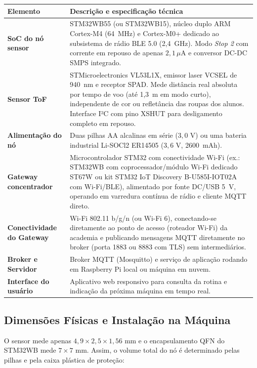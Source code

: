 \documentclass[11pt,a4paper]{article}
\begin{document}
\begin{longtable}{|L{4.8cm}|L{10.0cm}|}
\hline
\textbf{Elemento} & \textbf{Descrição e especificação técnica} \\ \hline
\endhead
\hline
\endfoot
\textbf{SoC do nó sensor} & STM32WB55 (ou STM32WB15), núcleo duplo ARM Cortex-M4 (64~MHz) e
Cortex-M0+ dedicado ao subsistema de rádio BLE 5.0 (2,4~GHz). Modo \emph{Stop 2} com
corrente em repouso de apenas $2{,}1\,\mu\text{A}$ e conversor DC-DC SMPS integrado. \\ \hline
\textbf{Sensor ToF} & STMicroelectronics VL53L1X, emissor laser VCSEL de 940~nm e receptor
SPAD. Mede distância real absoluta por tempo de voo (até 1,3~m em modo curto), independente
de cor ou refletância das roupas dos alunos. Interface I²C com pino XSHUT para desligamento
completo em repouso. \\ \hline
\textbf{Alimentação do nó} & Duas pilhas AA alcalinas em série ($3{,}0\text{ V}$) ou uma
bateria industrial Li-SOCl2 ER14505 ($3{,}6\text{ V}$, 2600~mAh). \\ \hline
\textbf{Gateway concentrador} & Microcontrolador STM32 com conectividade Wi-Fi (ex.: STM32WB
com coprocessador/módulo Wi-Fi dedicado ST67W ou kit STM32 IoT Discovery B-U585I-IOT02A com Wi-Fi/BLE),
alimentado por fonte DC/USB 5~V, operando em varredura contínua de rádio e cliente MQTT direto. \\ \hline
\textbf{Conectividade do Gateway} & Wi-Fi 802.11 b/g/n (ou Wi-Fi 6), conectando-se diretamente
ao ponto de acesso (roteador Wi-Fi) da academia e publicando mensagens MQTT diretamente no broker
(porta 1883 ou 8883 com TLS) sem intermediários. \\ \hline
\textbf{Broker e Servidor} & Broker MQTT (Mosquitto) e serviço de aplicação rodando em
Raspberry Pi local ou máquina em nuvem. \\ \hline
\textbf{Interface do usuário} & Aplicativo web responsivo para consulta da rotina e indicação
da próxima máquina em tempo real. \\ \hline
\end{longtable}

\subsection{Dimensões Físicas e Instalação na Máquina}
O sensor mede apenas $4{,}9 \times 2{,}5 \times 1{,}56\text{ mm}$ e o encapsulamento QFN do
STM32WB mede $7 \times 7\text{ mm}$. Assim, o volume total do nó é determinado pelas pilhas
e pela caixa plástica de proteção:
\end{document}
